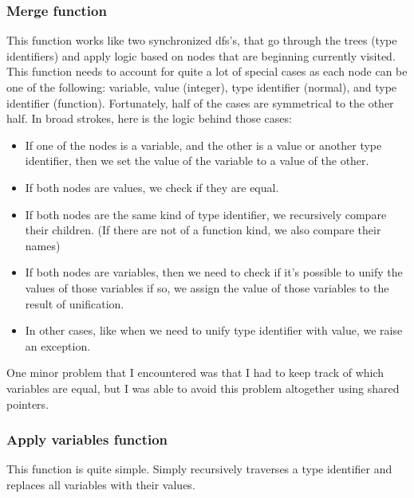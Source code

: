 \documentclass[12pt]{report}
\begin{document}
\subsubsection{Merge function} 
This function works like two synchronized dfs's, that go through the trees (type identifiers) and apply logic based on nodes that are beginning currently visited. 
This function needs to account for quite a lot of special cases as each node can be one of the following: variable, value (integer), type identifier (normal), and type identifier (function). Fortunately, half of the cases are symmetrical to the other half. In broad strokes, here is the logic behind those cases: 
\begin{itemize} 
   \item If one of the nodes is a variable, and the other is a value or another type identifier, then we set the value of the variable to a value of the other. 
   \item If both nodes are values, we check if they are equal. 
   \item If both nodes are the same kind of type identifier, we recursively compare their children. (If there are not of a function kind, we also compare their names) 
   \item If both nodes are variables, then we need to check if it's possible to unify the values of those variables if so, we assign the value of those variables to the result of unification. 
   \item In other cases, like when we need to unify type identifier with value, we raise an exception. 
\end{itemize} 
One minor problem that I encountered was that I had to keep track of which variables are equal, but I was able to avoid this problem altogether using shared pointers. 
\subsubsection{Apply variables function} 
This function is quite simple. Simply recursively traverses a type identifier and replaces all variables with their values. 
\end{document}
